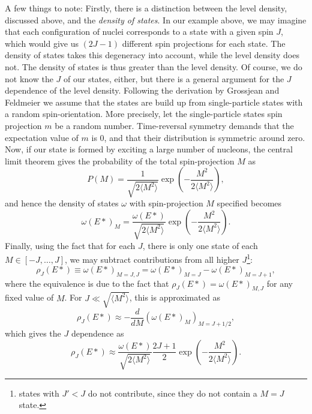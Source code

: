 A few things to note:
Firstly, there is a distinction between the level density, discussed above, and the \emph{density of states}. In our example above, we may imagine that each configuration of nuclei corresponds to a state with a given spin $J$, which would give us $(2J-1)$ different spin projections for each state. The density of states takes this degeneracy into account, while the level density does not. The density of states is thus greater than the level density.
Of course, we do not know the $J$ of our states, either, but there is a general argument for the $J$ dependence of the level density.
Following the derivation by Grossjean and Feldmeier\cite{grossjean1985} we assume that the states are build up from single-particle states with a random spin-orientation. More precisely, let the single-particle states spin projection $m$ be a random number. Time-reversal symmetry demands that the expectation value of $m$ is $0$, and that their distribution is symmetric around zero. Now, if our state is formed by exciting a large number of nucleons, the central limit theorem gives the probability of the total spin-projection $M$ as
\begin{equation}
P(M) = \frac{1}{\sqrt{2\langle M^2\rangle}} \exp{\left(-\frac{M^2}{2\langle M^2\rangle}\right)},
\end{equation}
and hence the density of states $\omega$ with spin-projection $M$ specified becomes
\begin{equation}
\omega(E*)_M =  \frac{\omega(E*)}{\sqrt{2\langle M^2\rangle}} \exp{\left(-\frac{M^2}{2\langle M^2\rangle}\right)}.
\end{equation}
Finally, using the fact that for each $J$, there is only one state of each $M \in [-J,\dots,J]$, we may subtract contributions from all higher $J$\footnote{states with $J'<J$ do not contribute, since they do not contain a $M=J$ state.}:
\begin{equation}
\rho_J(E*) \equiv \omega(E*)_{M=J, J} = \omega(E*)_{M=J}  -\omega(E*)_{M=J+1},
\end{equation}
where the equivalence is due to the fact that $\rho_J(E*) = \omega(E*)_{M, J}$ for any fixed value of $M$. For $J\ll \sqrt{\langle M^2 \rangle}$, this is approximated as
\begin{equation}
\rho_J(E*) \approx - \frac{d}{dM} \left( \omega(E*)_{M}\right)_{M=J+1/2},
\end{equation}
which gives the $J$ dependence as
\begin{equation}
\rho_J(E*) \approx \frac{\omega(E*)}{\sqrt{2\langle M^2\rangle}} \frac{2J+1}{2} \exp{\left(-\frac{M^2}{2\langle M^2\rangle}\right)}.\label{eq:rhoj}
\end{equation}

